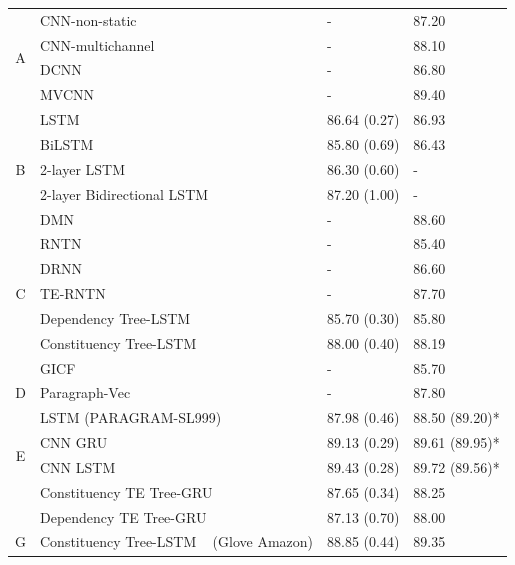 \begin{table}[H]
\begin{tabular}{c|lll}
    \multirow{4}{*}{A} & CNN-non-static~\cite{KimCNN} & - & 87.20\Tstrut \\
        & CNN-multichannel~\cite{KimCNN} & - & 88.10 \\
    & DCNN~\cite{DCNN} & - & 86.80 \\
    & MVCNN~\cite{2-layer-cnn} & - & 89.40 \\
\hline
        \multirow{5}{*}{B} & LSTM~\cite{originLSTM}    & 86.64 (0.27) & 86.93  \\
        & BiLSTM~\cite{GravesLSTM}  & 85.80 (0.69) & 86.43   \\
        & 2-layer LSTM~\cite{GravesLSTM} & 86.30 (0.60) & - \\
         & 2-layer Bidirectional LSTM~\cite{GravesLSTM} & 87.20 (1.00) & - \\
         & DMN~\cite{attention-gru} & - & 88.60 \\
\hline
        \multirow{5}{*}{C} & RNTN~\cite{socher2013recursive}  & - & 85.40  \\
        & DRNN~\cite{IrsoyDRNN} & - & 86.60 \\
        & TE-RNTN~\cite{tag-embedding-rnn} & - & 87.70 \\
        & Dependency Tree-LSTM  ~\cite{treeLSTM}  & 85.70 (0.30)  & 85.80 \\
         & Constituency Tree-LSTM ~\cite{treeLSTM} & 88.00 (0.40)    &   88.19\\
\hline
        \multirow{3}{*}{D} & GICF~\cite{group-instance} & - & 85.70 \\
         & Paragraph-Vec~\cite{ParagraphVec} & - & 87.80 \\
         & LSTM (PARAGRAM-SL999)~\cite{wieting2015towards} & 87.98 (0.46) & 88.50 (89.20)*
          \\
\hline
         \multirow{2}{*}{E}  & CNN GRU ~\cite{cnn-rnn}                    & 89.13 (0.29)  &  89.61 (89.95)*    \\
         & CNN LSTM ~\cite{cnn-rnn}                    & 89.43 (0.28)  & 89.72 (89.56)*\Bstrut    \\
\Xhline{3\arrayrulewidth}
\Xhline{3\arrayrulewidth}
         \multirow{2}{*}{F} & Constituency TE Tree-GRU                 & 87.65 (0.34) & 88.25\Tstrut \\
          & Dependency TE Tree-GRU                   & 87.13 (0.70)  & 88.00\Bstrut \\
\hline
\hline
        \multirow{1}{*}{G} & Constituency Tree-LSTM ~\cite{treeLSTM} (Glove Amazon) & 88.85 (0.44) & 89.35\Tstrut\Bstrut \\

\end{tabular}
\end{table}
